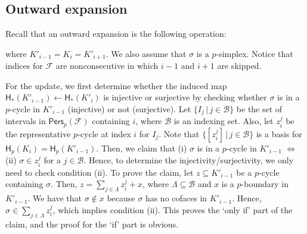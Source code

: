 \documentclass[letterpaper,11pt]{article}
\theoremstyle{mythmstyle}
\theoremstyle{mydefstyle}
\theoremstyle{plain}
\theoremstyle{definition}
\newcommand{\Hm}{\mathsf{H}}
\newcommand{\Pers}{\mathsf{Pers}}
\newcommand{\<}[1]{\langle #1\rangle}
\newcommand{\lbarrowspace}{\;}
\newcommand{\inctosp}[1]{\xhookrightarrow{\lbarrowspace#1\lbarrowspace}}
\newcommand{\bakinctosp}[1]{\xhookleftarrow{\lbarrowspace#1\lbarrowspace}}
\newcommand{\given}{\,|\,}
\newcommand{\Set}[1]{\{#1\}}
\newcommand{\Bcal}{\mathcal{B}}
\newcommand{\Fcal}{\mathcal{F}}
\newcommand{\LG}{\Lambda}
\newcommand{\sG}{\sigma}
\newcommand{\Dim}{p}
\newcommand{\filtcnt}{m}
\newcommand{\cyc}{z}
\begin{document}
\subsection{Outward expansion}
\label{sec:out-expan}

Recall that an outward expansion is the following operation:

\vspace{-0.5em}
\begin{center}
\end{center}

\vspace{-1em}\noindent
where $K'_{i-1}=K_{i}=K'_{i+1}$.
We also assume that $\sG$ is a $\Dim$-simplex.
Notice that
indices for $\Fcal$ are nonconsecutive
in which $i-1$ and $i+1$ are skipped.

For the update,
we first determine whether the induced map 
$\Hm_*(K'_{i-1})\leftarrow \Hm_*(K'_i)$
is injective
or 
surjective
by checking whether 
$\sG$ is in a $\Dim$-cycle in $K'_{i-1}$
(injective)
or not
(surjective).
Let $\Set{I_j\given j\in\Bcal}$ be the set of 
intervals in $\Pers_\Dim(\Fcal)$ containing $i$, where $\Bcal$
is an indexing set.
Also, let $\cyc^j_i$ be the representative $\Dim$-cycle at index $i$
for $I_j$.
Note that $\Set{[\cyc^j_i]\given j\in\Bcal}$ is a basis for
$\Hm_\Dim(K_i)=\Hm_\Dim(K'_{i-1})$.
Then, we claim that (i) $\sG$ is in a $\Dim$-cycle in $K'_{i-1}$
$\Leftrightarrow$
(ii) $\sG\in\cyc^j_i$ for a $j\in\Bcal$.
Hence, to determine the injectivity/surjectivity,
we only need to check condition (ii).
To prove the claim, let $\cyc\subseteq K'_{i-1}$ be a $\Dim$-cycle containing $\sG$.
Then, $\cyc=\sum_{j\in\LG}\cyc^j_i+x$, where $\LG\subseteq\Bcal$
and $x$ is a $\Dim$-boundary in $K'_{i-1}$.
We have that $\sG\not\in x$ because $\sG$ has no cofaces in $K'_{i-1}$.
Hence, $\sG\in\sum_{j\in\LG}\cyc^j_i$, which implies condition (ii).
This proves the `only if' part of the claim,
and the proof for the `if' part is obvious.
\end{document}
